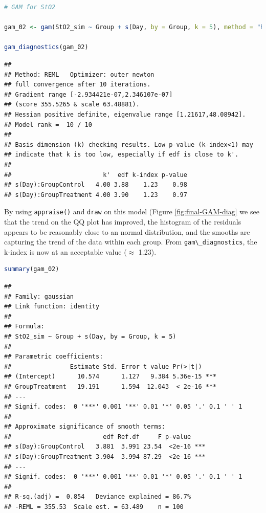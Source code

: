 \documentclass[
]{article}
\newcommand{\passthrough}[1]{#1}
\begin{document}
\begin{lstlisting}[language=R]
# GAM for StO2

gam_02 <- gam(StO2_sim ~ Group + s(Day, by = Group, k = 5), method = "REML", data = dat_sim)

gam_diagnostics(gam_02)
\end{lstlisting}

\begin{lstlisting}
## 
## Method: REML   Optimizer: outer newton
## full convergence after 10 iterations.
## Gradient range [-2.934421e-07,2.346107e-07]
## (score 355.5265 & scale 63.48881).
## Hessian positive definite, eigenvalue range [1.21617,48.08942].
## Model rank =  10 / 10 
## 
## Basis dimension (k) checking results. Low p-value (k-index<1) may
## indicate that k is too low, especially if edf is close to k'.
## 
##                         k'  edf k-index p-value
## s(Day):GroupControl   4.00 3.88    1.23    0.98
## s(Day):GroupTreatment 4.00 3.90    1.23    0.97
\end{lstlisting}

By using \passthrough{\lstinline!appraise()!} and \passthrough{\lstinline!draw!} on this model (Figure \ref{fig:final-GAM-diag} we see that the trend on the QQ plot has improved, the histogram of the residuals appears to be reasonably close to an normal distribution, and the smooths are capturing the trend of the data within each group. From \passthrough{\lstinline!gam\_diagnostics!}, the k-index is now at an acceptable value (\(\approx\) 1.23).

\begin{lstlisting}[language=R]
summary(gam_02)
\end{lstlisting}

\begin{lstlisting}
## 
## Family: gaussian 
## Link function: identity 
## 
## Formula:
## StO2_sim ~ Group + s(Day, by = Group, k = 5)
## 
## Parametric coefficients:
##                Estimate Std. Error t value Pr(>|t|)    
## (Intercept)      10.574      1.127   9.384 5.36e-15 ***
## GroupTreatment   19.191      1.594  12.043  < 2e-16 ***
## ---
## Signif. codes:  0 '***' 0.001 '**' 0.01 '*' 0.05 '.' 0.1 ' ' 1
## 
## Approximate significance of smooth terms:
##                         edf Ref.df     F p-value    
## s(Day):GroupControl   3.881  3.991 23.54  <2e-16 ***
## s(Day):GroupTreatment 3.904  3.994 87.29  <2e-16 ***
## ---
## Signif. codes:  0 '***' 0.001 '**' 0.01 '*' 0.05 '.' 0.1 ' ' 1
## 
## R-sq.(adj) =  0.854   Deviance explained = 86.7%
## -REML = 355.53  Scale est. = 63.489    n = 100
\end{lstlisting}
\end{document}
